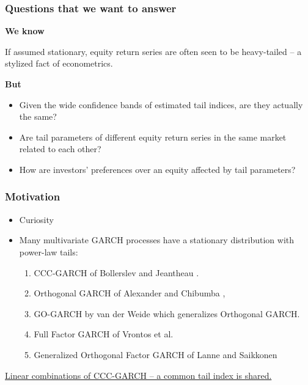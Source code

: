 \documentclass{beamer}
\begin{document}
\begin{frame}
  \frametitle{Questions that we want to answer}
  \textcolor[HTML]{990033}{\bf We know}

  If assumed stationary, equity return series are often seen to be
  heavy-tailed -- a stylized fact of econometrics.
  
  \textcolor[HTML]{990033}{\bf But}
  \begin{itemize}
    \item Given the wide confidence bands of estimated tail indices,
      are they actually the same?
    \item Are tail parameters of different equity return series in the same
      market related to each other?
    \item How are investors' preferences over an equity affected by
      tail parameters?
  \end{itemize}
\end{frame}

\begin{frame}
  \frametitle{Motivation}
  \begin{itemize}
  \item Curiosity
    \item Many multivariate GARCH processes have a stationary
      distribution with power-law tails:
      \begin{enumerate}
        \item CCC-GARCH of Bollerslev \cite{bollerslev:1990} and
          Jeantheau \cite{jeantheau:1998}.
        \item Orthogonal GARCH of
          Alexander and Chibumba \cite{alexander:chibumba:1996},
        \item GO-GARCH by van der Weide \cite{Weide2002} which
          generalizes Orthogonal GARCH.
        \item Full Factor GARCH of Vrontos et
          al. \cite{vrontos2003full}
        \item Generalized Orthogonal Factor GARCH of Lanne and
          Saikkonen  \cite{lanne2007modelling}
      \end{enumerate}
  \end{itemize}
  \underline{Linear combinations of CCC-GARCH -- a common tail index is shared.}
\end{frame}
\end{document}
